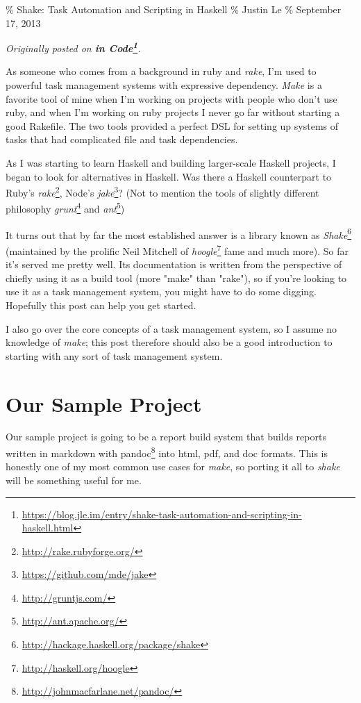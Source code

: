 \documentclass[]{article}
\renewcommand{\href}[2]{#2\footnote{\url{#1}}}
\begin{document}
\% Shake: Task Automation and Scripting in Haskell \% Justin Le \% September 17,
2013

\emph{Originally posted on
\textbf{\href{https://blog.jle.im/entry/shake-task-automation-and-scripting-in-haskell.html}{in
Code}}.}

As someone who comes from a background in ruby and \emph{rake}, I'm used to
powerful task management systems with expressive dependency. \emph{Make} is a
favorite tool of mine when I'm working on projects with people who don't use
ruby, and when I'm working on ruby projects I never go far without starting a
good Rakefile. The two tools provided a perfect DSL for setting up systems of
tasks that had complicated file and task dependencies.

As I was starting to learn Haskell and building larger-scale Haskell projects, I
began to look for alternatives in Haskell. Was there a Haskell counterpart to
Ruby's \href{http://rake.rubyforge.org/}{\emph{rake}}, Node's
\href{https://github.com/mde/jake}{\emph{jake}}? (Not to mention the tools of
slightly different philosophy \href{http://gruntjs.com/}{\emph{grunt}} and
\href{http://ant.apache.org/}{\emph{ant}})

It turns out that by far the most established answer is a library known as
\href{http://hackage.haskell.org/package/shake}{\emph{Shake}} (maintained by the
prolific Neil Mitchell of \href{http://haskell.org/hoogle}{\emph{hoogle}} fame
and much more). So far it's served me pretty well. Its documentation is written
from the perspective of chiefly using it as a build tool (more "make" than
"rake"), so if you're looking to use it as a task management system, you might
have to do some digging. Hopefully this post can help you get started.

I also go over the core concepts of a task management system, so I assume no
knowledge of \emph{make}; this post therefore should also be a good introduction
to starting with any sort of task management system.

\section{Our Sample Project}

Our sample project is going to be a report build system that builds reports
written in markdown with \href{http://johnmacfarlane.net/pandoc/}{pandoc} into
html, pdf, and doc formats. This is honestly one of my most common use cases for
\emph{make}, so porting it all to \emph{shake} will be something useful for me.
\end{document}
